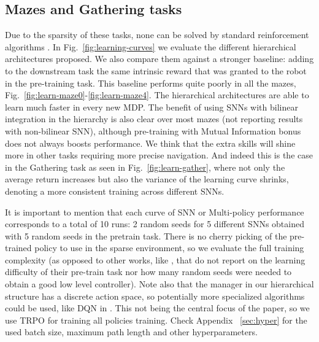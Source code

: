 \documentclass{article} %
\begin{document}
\subsection{Mazes and Gathering tasks}
Due to the sparsity of these tasks, none can be solved by standard reinforcement algorithms \citep{duan2016benchmarking}. In Fig.\ \ref{fig:learning-curves} we evaluate the different hierarchical architectures proposed. We also compare them against a stronger baseline: adding to the downstream task the same intrinsic reward that was granted to the robot in the pre-training task. This baseline performs quite poorly in all the mazes, Fig.\ \ref{fig:learn-maze0}-\ref{fig:learn-maze4}. The hierarchical architectures are able to learn much faster in every new MDP. The benefit of using SNNs with bilinear integration in the hierarchy is also clear over most mazes (not reporting results with non-bilinear SNN), although pre-training with Mutual Information bonus does not always boosts performance. We think that the extra skills will shine more in other tasks requiring more precise navigation. And indeed this is the case in the Gathering task as seen in Fig.\ \ref{fig:learn-gather}, where not only the average return increases but also the variance of the learning curve shrinks, denoting a more consistent training across different SNNs. 

It is important to mention that each curve of SNN or Multi-policy performance corresponds to a total of 10 runs: 2 random seeds for 5 different SNNs obtained with 5 random seeds in the pretrain task. There is no cherry picking of the pre-trained policy to use in the sparse environment, so we evaluate the full training complexity (as opposed to other works, like \citet{heess2016learning}, that do not report on the learning difficulty of their pre-train task nor how many random seeds were needed to obtain a good low level controller). Note also that the manager in our hierarchical structure has a discrete action space, so potentially more specialized algorithms could be used, like DQN in \citet{mnih2015human}. This not being the central focus of the paper, so we use TRPO for training all policies training. Check Appendix \ \ref{sec:hyper} for the used batch size, maximum path length and other hyperparameters. 
\end{document}
